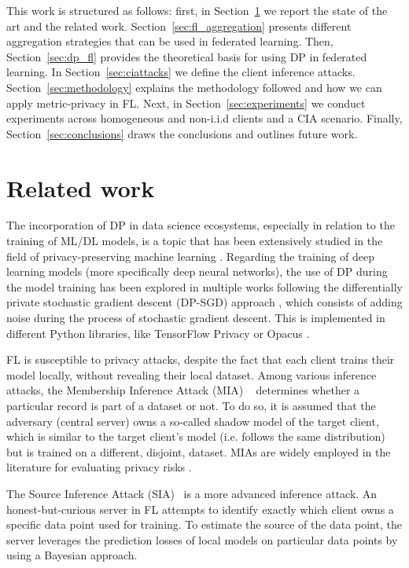 \documentclass[5p,times]{elsarticle}
\begin{document}
This work is structured as follows: first, in Section~\ref{sec:sota} we report the state of the art and the related work. Section~\ref{sec:fl_aggregation} presents different aggregation strategies that can be used in federated learning. Then, Section~\ref{sec:dp_fl} provides the theoretical basis for using DP in federated learning. In Section~\ref{sec:ciattacks} we define the client inference attacks. Section~\ref{sec:methodology} explains the methodology followed and how we can apply metric-privacy in FL. Next, in Section~\ref{sec:experiments} we conduct experiments across homogeneous and non-i.i.d clients and a CIA scenario.
Finally, Section~\ref{sec:conclusions} draws the conclusions and outlines future work.

\section{Related work}\label{sec:sota}

The incorporation of DP in data science ecosystems, especially in relation to the training of ML/DL models, is a topic that has been extensively studied in the field of privacy-preserving machine learning \cite{pan2024differential}. Regarding the training of deep learning models (more specifically deep neural networks), the use of DP during the model training has been explored in multiple works following the differentially private stochastic gradient descent (DP-SGD) approach \cite{abadi2016deep, ha2019differential, xie2021differential}, which consists of adding noise during the process of stochastic gradient descent. This is implemented in different Python libraries, like TensorFlow Privacy \cite{tensorflow2015-whitepaper} or Opacus \cite{Opacus}. 

FL is susceptible to privacy attacks, despite the fact that each client trains their model locally, without revealing their local dataset.
Among various inference attacks, the Membership Inference Attack (MIA)  ~\cite{nasr2019comprehensive,mia_attack,carlini2022membership} determines whether a particular record is part of a dataset or not.  To do so, it is assumed that the adversary (central server) owns a so-called shadow model of the target client, which is similar to the target client’s model (i.e. follows the same distribution) but is trained on a different, disjoint, dataset.
MIAs are widely employed in the literature for evaluating privacy risks \cite{10.1145/3523273}.

The Source Inference Attack (SIA)~\cite{sia_paper} is a more advanced inference attack. An honest-but-curious server in FL attempts to identify exactly which client owns a specific data point used for training. To estimate the source of the data point, the server leverages the prediction losses of local models on particular data points by using a Bayesian approach. 
\end{document}
